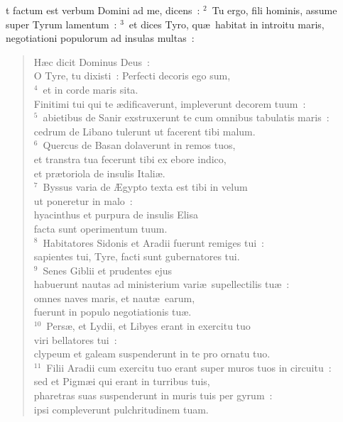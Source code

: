 \bchapter
{}t factum est verbum Domini ad me, dicens~:
${}^{2}$~Tu ergo, fili hominis, assume super Tyrum lamentum~:
${}^{3}$~et dices Tyro, qu\ae\ habitat in introitu maris, negotiationi populorum ad insulas multas~: \begin{verse}H\ae c dicit Dominus Deus~:\\ O Tyre, tu dixisti~: Perfecti decoris ego sum,\\
${}^{4}$~et in corde maris sita.\\ Finitimi tui qui te \ae dificaverunt, impleverunt decorem tuum~:\\
${}^{5}$~abietibus de Sanir exstruxerunt te cum omnibus tabulatis maris~:\\ cedrum de Libano tulerunt ut facerent tibi malum.\\
${}^{6}$~Quercus de Basan dolaverunt in remos tuos,\\ et transtra tua fecerunt tibi ex ebore indico,\\ et pr\ae toriola de insulis Itali\ae .\\
${}^{7}$~Byssus varia de \AE gypto texta est tibi in velum\\ ut poneretur in malo~:\\ hyacinthus et purpura de insulis Elisa\\ facta sunt operimentum tuum.\\
${}^{8}$~Habitatores Sidonis et Aradii fuerunt remiges tui~:\\ sapientes tui, Tyre, facti sunt gubernatores tui.\\
${}^{9}$~Senes Giblii et prudentes ejus\\ habuerunt nautas ad ministerium vari\ae\ supellectilis tu\ae~:\\ omnes naves maris, et naut\ae\ earum,\\ fuerunt in populo negotiationis tu\ae .\\
${}^{10}$~Pers\ae , et Lydii, et Libyes erant in exercitu tuo\\ viri bellatores tui~:\\ clypeum et galeam suspenderunt in te pro ornatu tuo.\\
${}^{11}$~Filii Aradii cum exercitu tuo erant super muros tuos in circuitu~:\\ sed et Pigm\ae i qui erant in turribus tuis,\\ pharetras suas suspenderunt in muris tuis per gyrum~:\\ ipsi compleverunt pulchritudinem tuam.\\

\end{verse}
